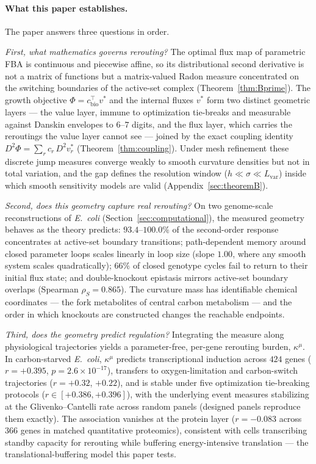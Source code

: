 \documentclass[11pt,a4paper]{article}
\theoremstyle{plain}
\theoremstyle{definition}
\theoremstyle{remark}
\newcommand{\kmu}{\kappa^{\mu}}
\begin{document}
\paragraph{What this paper establishes.}
The paper answers three questions in order.

\emph{First, what mathematics governs rerouting?} The optimal flux map
of parametric FBA is continuous and piecewise affine, so its
distributional second derivative is not a matrix of functions but a
matrix-valued Radon measure concentrated on the switching boundaries of
the active-set complex (Theorem~\ref{thm:Bprime}). The growth objective
$\Phi = c_{\mathrm{bio}}^\top v^*$ and the internal fluxes $v^*$ form
two distinct geometric layers --- the value layer, immune to
optimization tie-breaks and measurable against Danskin envelopes to
$6$--$7$ digits, and the flux layer, which carries the reroutings the
value layer cannot see --- joined by the exact coupling identity
$D^2 \Phi = \sum_r c_r\, D^2 v^*_r$ (Theorem~\ref{thm:coupling}).
Under mesh refinement these discrete jump measures converge weakly to
smooth curvature densities but not in total variation, and the gap
defines the resolution window ($h \ll \sigma \ll L_{\mathrm{var}}$)
inside which smooth sensitivity models are valid
(Appendix~\ref{sec:theoremB}).

\emph{Second, does this geometry capture real rerouting?} On two
genome-scale reconstructions of \emph{E.~coli}
(Section~\ref{sec:computational}), the measured geometry behaves as
the theory predicts: $93.4$--$100.0\%$ of the second-order response
concentrates at active-set boundary transitions; path-dependent memory
around closed parameter loops scales linearly in loop size (slope
$1.00$, where any smooth system scales quadratically); $66\%$ of
closed genotype cycles fail to return to their initial flux state; and
double-knockout epistasis mirrors active-set boundary overlaps
(Spearman $\rho_S = 0.865$). The curvature mass has identifiable
chemical coordinates --- the fork metabolites of central carbon
metabolism --- and the order in which knockouts are constructed
changes the reachable endpoints.

\emph{Third, does the geometry predict regulation?} Integrating the
measure along physiological trajectories yields a parameter-free,
per-gene rerouting burden, $\kmu$. In carbon-starved \emph{E.~coli},
$\kmu$ predicts transcriptional induction across $424$ genes
($r = +0.395$, $p = 2.6 \times 10^{-17}$), transfers to
oxygen-limitation and carbon-switch trajectories ($r = +0.32$,
$+0.22$), and is stable under five optimization tie-breaking protocols
($r \in [+0.386, +0.396]$), with the underlying event measures
stabilizing at the Glivenko--Cantelli rate across random panels
(designed panels reproduce them exactly). The association vanishes
at the protein layer ($r = -0.083$ across $366$ genes in matched
quantitative proteomics), consistent with cells transcribing
standby capacity for rerouting while buffering energy-intensive
translation --- the translational-buffering model this paper tests.
\end{document}
